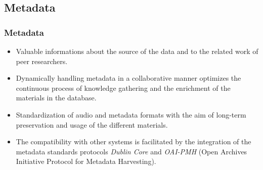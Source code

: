 \documentclass[final, hyperref, table]{beamer}
\begin{document}
\subsection{Metadata}\label{sec:metadata}
\begin{frame}\frametitle{Metadata}
  \begin{block}{}
    \begin{itemize}
    \item Valuable informations about the \alert{source of the data} and to the related \alert{work of
        peer researchers}.
    \item Dynamically handling metadata in a \alert{collaborative}
      manner optimizes the continuous process of knowledge gathering
      and the \alert{enrichment} of the materials in the database.
    \item \alert{Standardization}
      of audio and metadata formats with the aim of long-term
      preservation and usage of the different materials.
    \item The compatibility with other systems is facilitated by the
      integration of the \alert{metadata standards protocols}
      \emph{Dublin Core} and \emph{OAI-PMH} (Open Archives Initiative
      Protocol for Metadata Harvesting).
    \end{itemize}
  \end{block}
\end{frame}
\end{document}
